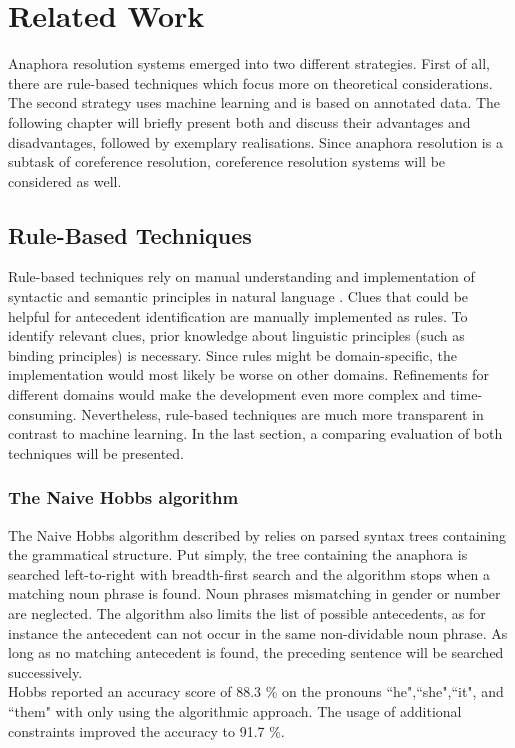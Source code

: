 \chapter{Related Work}
\label{sec:Related Work}

Anaphora resolution systems emerged into two different strategies. First of all, there are rule-based techniques which focus more on theoretical considerations. The second strategy uses machine learning and is based on annotated data. The following chapter will briefly present both and discuss their advantages and disadvantages, followed by exemplary realisations. Since anaphora resolution is a subtask of coreference resolution, coreference resolution systems will be considered as well.

\section{Rule-Based Techniques}
Rule-based techniques rely on manual understanding and implementation of syntactic and semantic principles in natural language \citep{kennedy1996anaphora,mitkov1994integrated,ingria1989computational}. Clues that could be helpful for antecedent identification are manually implemented as rules. To identify relevant clues, prior knowledge about linguistic principles (such as binding principles) is necessary. Since rules might be domain-specific, the implementation would most likely be worse on other domains. Refinements for different domains would make the development even more complex and time-consuming. Nevertheless, rule-based techniques are much more transparent in contrast to machine learning. In the last section, a comparing evaluation of both techniques will be presented.

\subsection{The Naive Hobbs algorithm}
The Naive Hobbs algorithm described by \citep{hobbs1978resolving} relies on parsed syntax trees containing the grammatical structure. Put simply, the tree containing the anaphora is searched left-to-right with breadth-first search and the algorithm stops when a matching noun phrase is found. Noun phrases mismatching in gender or number are neglected. The algorithm also limits the list of possible antecedents, as for instance the antecedent can not occur in the same non-dividable noun phrase. As long as no matching antecedent is found, the preceding sentence will be searched successively. \\
Hobbs reported an accuracy score of 88.3 \% on the pronouns “he",“she",“it", and “them" with only using the algorithmic approach. The usage of additional constraints improved the accuracy to 91.7 \%.


